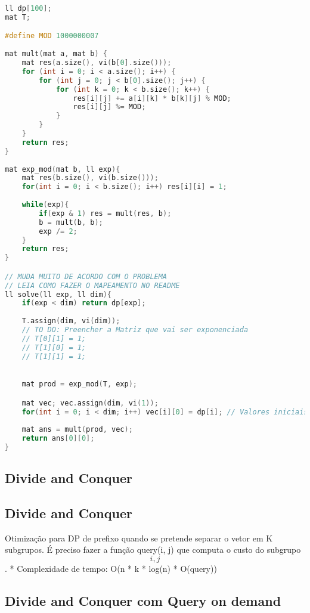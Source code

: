 \documentclass[11pt, a4paper, twoside]{article}
\begin{document}
\begin{lstlisting}[language=C++]
ll dp[100];
mat T;

#define MOD 1000000007
 
mat mult(mat a, mat b) {
    mat res(a.size(), vi(b[0].size()));
    for (int i = 0; i < a.size(); i++) {
        for (int j = 0; j < b[0].size(); j++) {
            for (int k = 0; k < b.size(); k++) {
                res[i][j] += a[i][k] * b[k][j] % MOD;
                res[i][j] %= MOD;
            }
        }
    }
    return res;
}
 
mat exp_mod(mat b, ll exp){
    mat res(b.size(), vi(b.size()));
    for(int i = 0; i < b.size(); i++) res[i][i] = 1;
    
    while(exp){
        if(exp & 1) res = mult(res, b);
        b = mult(b, b);
        exp /= 2;
    }
    return res;
}

// MUDA MUITO DE ACORDO COM O PROBLEMA
// LEIA COMO FAZER O MAPEAMENTO NO README
ll solve(ll exp, ll dim){
    if(exp < dim) return dp[exp];
    
    T.assign(dim, vi(dim));
    // TO DO: Preencher a Matriz que vai ser exponenciada
    // T[0][1] = 1;
    // T[1][0] = 1;
    // T[1][1] = 1;
    

    mat prod = exp_mod(T, exp);

    mat vec; vec.assign(dim, vi(1));
    for(int i = 0; i < dim; i++) vec[i][0] = dp[i]; // Valores iniciais
    
    mat ans = mult(prod, vec);
    return ans[0][0];
}\end{lstlisting}

\subsection{Divide and Conquer}

\subsection{Divide and Conquer}



Otimização para DP de prefixo quando se pretende separar o vetor em K subgrupos.    
É preciso fazer a função query(i, j) que computa o custo do subgrupo \[i, j\].
* Complexidade de tempo: O(n * k * log(n) *  O(query))

\subsection{Divide and Conquer com Query on demand}
\end{document}
